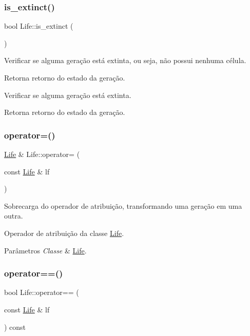 \subsubsection{\texorpdfstring{is\+\_\+extinct()}{is\_extinct()}}
{\footnotesize\ttfamily bool Life\+::is\+\_\+extinct (\begin{DoxyParamCaption}{ }\end{DoxyParamCaption})}

Verificar se alguma geração está extinta, ou seja, não possui nenhuma célula. \begin{DoxyReturn}{Retorna}
retorno do estado da geração.
\end{DoxyReturn}
Verificar se alguma geração está extinta. \begin{DoxyReturn}{Retorna}
retorno do estado da geração. 
\end{DoxyReturn}
\mbox{\label{classLife_a79902e1e85146df19fb2b920899a5a36}} 
\subsubsection{\texorpdfstring{operator=()}{operator=()}}
{\footnotesize\ttfamily \hyperlink{classLife}{Life} \& Life\+::operator= (\begin{DoxyParamCaption}\item[{const \hyperlink{classLife}{Life} \&}]{lf }\end{DoxyParamCaption})}



Sobrecarga do operador de atribuição, transformando uma geração em uma outra. 

Operador de atribuição da classe \hyperlink{classLife}{Life}. 
\begin{DoxyParams}{Parâmetros}
{\em Classe} & \hyperlink{classLife}{Life}. \\
\hline
\end{DoxyParams}
\mbox{\label{classLife_a50ef5ca2efcc8053b8d54fad159722cb}} 
\subsubsection{\texorpdfstring{operator==()}{operator==()}}
{\footnotesize\ttfamily bool Life\+::operator== (\begin{DoxyParamCaption}\item[{const \hyperlink{classLife}{Life} \&}]{lf }\end{DoxyParamCaption}) const}



